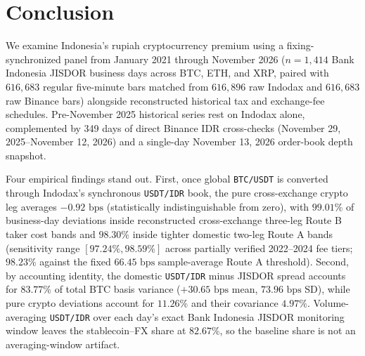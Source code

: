 \section{Conclusion}
\label{sec:conclusion}

We examine Indonesia's rupiah cryptocurrency premium using a fixing-synchronized panel from January 2021 through November 2026 ($n = 1,414$ Bank Indonesia JISDOR business days across BTC, ETH, and XRP, paired with $616,683$ regular five-minute bars matched from $616,896$ raw Indodax and $616,683$ raw Binance bars) alongside reconstructed historical tax and exchange-fee schedules. Pre-November 2025 historical series rest on Indodax alone, complemented by 349 days of direct Binance IDR cross-checks (November 29, 2025--November 12, 2026) and a single-day November 13, 2026 order-book depth snapshot.

Four empirical findings stand out. First, once global \texttt{BTC/USDT} is converted through Indodax's synchronous \texttt{USDT/IDR} book, the pure cross-exchange crypto leg averages $-0.92\text{ bps}$ (statistically indistinguishable from zero), with $99.01\%$ of business-day deviations inside reconstructed cross-exchange three-leg Route B taker cost bands and $98.30\%$ inside tighter domestic two-leg Route A bands (sensitivity range $[97.24\%, 98.59\%]$ across partially verified 2022--2024 fee tiers; $98.23\%$ against the fixed $66.45\text{ bps}$ sample-average Route A threshold). Second, by accounting identity, the domestic \texttt{USDT/IDR} minus JISDOR spread accounts for $83.77\%$ of total BTC basis variance ($+30.65\text{ bps}$ mean, $73.96\text{ bps}$ SD), while pure crypto deviations account for $11.26\%$ and their covariance $4.97\%$. Volume-averaging \texttt{USDT/IDR} over each day's exact Bank Indonesia JISDOR monitoring window leaves the stablecoin--FX share at $82.67\%$, so the baseline share is not an averaging-window artifact.

